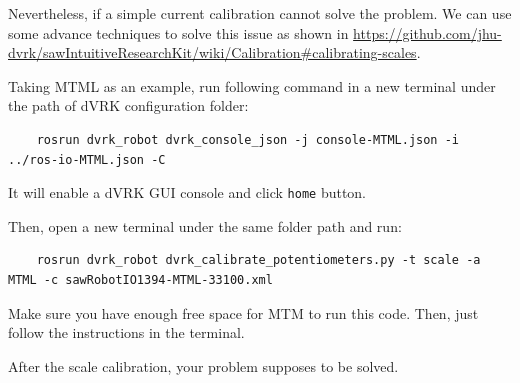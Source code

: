Nevertheless, if a simple current calibration cannot solve the problem. We can use some advance techniques to solve this issue as shown in \url{https://github.com/jhu-dvrk/sawIntuitiveResearchKit/wiki/Calibration#calibrating-scales}. 

Taking MTML as an example, run following command in a new terminal under the path of dVRK configuration folder:

\begin{verbatim}
    rosrun dvrk_robot dvrk_console_json -j console-MTML.json -i ../ros-io-MTML.json -C
\end{verbatim}

It will enable a dVRK GUI console and click \texttt{home} button.

Then, open a new terminal under the same folder path and run:

\begin{verbatim}
    rosrun dvrk_robot dvrk_calibrate_potentiometers.py -t scale -a MTML -c sawRobotIO1394-MTML-33100.xml
\end{verbatim}

Make sure you have enough free space for MTM to run this code. Then, just follow the instructions in the terminal.

After the scale calibration, your problem supposes to be solved.


\clearpage

\printbibliography





